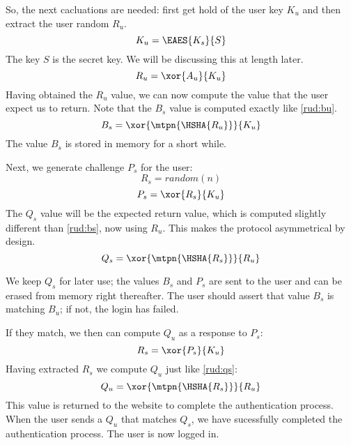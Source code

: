 \par
So, the next cacluations are needed: first get hold of the user key \(K_u\) and then extract the user random \(R_u\).
\begin{equation}\label{rud:sku}
K_u = \EAES{K_s}{S}
\end{equation}
The key \(S\) is the secret key.
We will be discussing this at length later.
\begin{equation}\label{rud:sru}
R_u = \xor{A_u}{K_u}
\end{equation}
Having obtained the \(R_u\) value, we can now compute the value that the user expect us to return.
Note that the \(B_s\) value is computed exactly like \eqref{rud:bu}.
\begin{equation}\label{rud:bs}
B_s = \xor{\mtpn{\HSHA{R_u}}}{K_u}
\end{equation}
The value \(B_s\) is stored in memory for a short while.
\par
Next, we generate challenge \(P_s\) for the user:
\begin{equation}\label{rud:rs}
R_s = random(n)
\end{equation}
\begin{equation}\label{rud:ps}
P_s = \xor{R_s}{K_u}
\end{equation}
The \(Q_s\) value will be the expected return value, which is computed slightly different than \eqref{rud:bs}, now using \(R_u\).
This makes the protocol asymmetrical by design.
\begin{equation}\label{rud:qs}
Q_s = \xor{\mtpn{\HSHA{R_s}}}{R_u}
\end{equation}
\par
We keep \(Q_s\) for later use; the values \(B_s\) and \(P_s\) are sent to the user and can be erased from memory right thereafter.
The user should assert that value \(B_s\) is  matching \(B_u\);
if not, the login has failed.
\par
If they match, we then can compute \(Q_u\) as a response to \(P_s\):
\begin{equation}
R_s = \xor{P_s}{K_u}
\end{equation}
Having extracted \(R_s\) we compute \(Q_u\) just like \eqref{rud:qs}:
\begin{equation}
Q_u = \xor{\mtpn{\HSHA{R_s}}}{R_u}
\end{equation}
This value is returned to the website to complete the authentication process.
When the user sends a \(Q_u\) that matches \(Q_s\), we have sucessfully completed the authentication process.
The user is now logged in.
